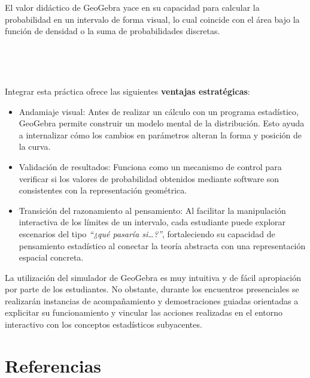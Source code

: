 \documentclass[
  spanish,
  letterpaper,
  DIV=11,
  numbers=noendperiod]{scrreprt}
\providecommand{\tightlist}{%
  \setlength{\itemsep}{0pt}\setlength{\parskip}{0pt}}
\begin{document}
El valor didáctico de GeoGebra yace en su capacidad para calcular la
probabilidad en un intervalo de forma visual, lo cual coincide con el
área bajo la función de densidad o la suma de probabilidades discretas.

~

~

Integrar esta práctica ofrece las siguientes \textbf{ventajas
estratégicas}:

\begin{itemize}
\tightlist
\item
  Andamiaje visual: Antes de realizar un cálculo con un programa
  estadístico, GeoGebra permite construir un modelo mental de la
  distribución. Esto ayuda a internalizar cómo los cambios en parámetros
  alteran la forma y posición de la curva.
\item
  Validación de resultados: Funciona como un mecanismo de control para
  verificar si los valores de probabilidad obtenidos mediante software
  son consistentes con la representación geométrica.
\item
  Transición del razonamiento al pensamiento: Al facilitar la
  manipulación interactiva de los límites de un intervalo, cada
  estudiante puede explorar escenarios del tipo \emph{``¿qué pasaría
  si\ldots?''}, fortaleciendo su capacidad de pensamiento estadístico al
  conectar la teoría abstracta con una representación espacial concreta.
\end{itemize}

La utilización del simulador de GeoGebra es muy intuitiva y de fácil
apropiación por parte de los estudiantes. No obstante, durante los
encuentros presenciales se realizarán instancias de acompañamiento y
demostraciones guiadas orientadas a explicitar su funcionamiento y
vincular las acciones realizadas en el entorno interactivo con los
conceptos estadísticos subyacentes.


\chapter*{Referencias}\label{referencias}

\end{document}
